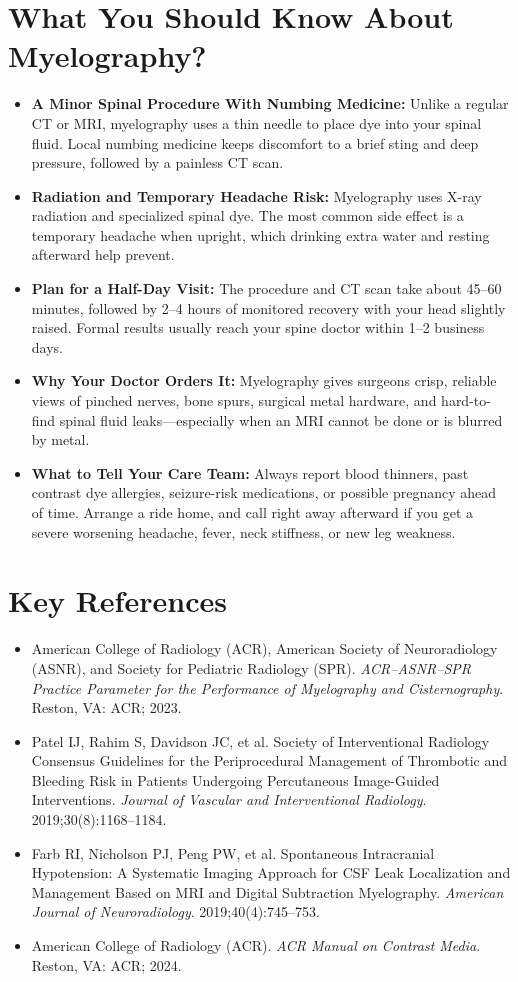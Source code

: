 \section{What You Should Know About Myelography?}
\begin{itemize}
    \item \textbf{A Minor Spinal Procedure With Numbing Medicine:} Unlike a regular CT or MRI, myelography uses a thin needle to place dye into your spinal fluid. Local numbing medicine keeps discomfort to a brief sting and deep pressure, followed by a painless CT scan.
    \item \textbf{Radiation and Temporary Headache Risk:} Myelography uses X-ray radiation and specialized spinal dye. The most common side effect is a temporary headache when upright, which drinking extra water and resting afterward help prevent.
    \item \textbf{Plan for a Half-Day Visit:} The procedure and CT scan take about 45--60 minutes, followed by 2--4 hours of monitored recovery with your head slightly raised. Formal results usually reach your spine doctor within 1--2 business days.
    \item \textbf{Why Your Doctor Orders It:} Myelography gives surgeons crisp, reliable views of pinched nerves, bone spurs, surgical metal hardware, and hard-to-find spinal fluid leaks---especially when an MRI cannot be done or is blurred by metal.
    \item \textbf{What to Tell Your Care Team:} Always report blood thinners, past contrast dye allergies, seizure-risk medications, or possible pregnancy ahead of time. Arrange a ride home, and call right away afterward if you get a severe worsening headache, fever, neck stiffness, or new leg weakness.
\end{itemize}

\section{Key References}
\begin{itemize}
    \item American College of Radiology (ACR), American Society of Neuroradiology (ASNR), and Society for Pediatric Radiology (SPR). \textit{ACR--ASNR--SPR Practice Parameter for the Performance of Myelography and Cisternography}. Reston, VA: ACR; 2023.
    \item Patel IJ, Rahim S, Davidson JC, et al. Society of Interventional Radiology Consensus Guidelines for the Periprocedural Management of Thrombotic and Bleeding Risk in Patients Undergoing Percutaneous Image-Guided Interventions. \textit{Journal of Vascular and Interventional Radiology}. 2019;30(8):1168--1184.
    \item Farb RI, Nicholson PJ, Peng PW, et al. Spontaneous Intracranial Hypotension: A Systematic Imaging Approach for CSF Leak Localization and Management Based on MRI and Digital Subtraction Myelography. \textit{American Journal of Neuroradiology}. 2019;40(4):745--753.
    \item American College of Radiology (ACR). \textit{ACR Manual on Contrast Media}. Reston, VA: ACR; 2024.
\end{itemize}
